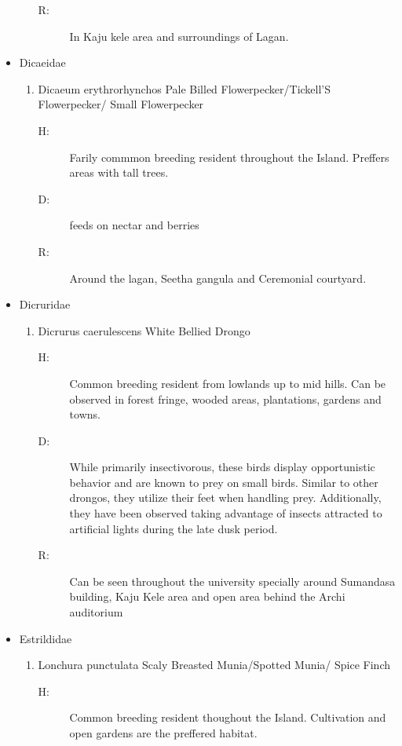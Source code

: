 \begin{itemize}
\begin{enumerate}
\begin{description}
\item[R: ]%
In Kaju kele area and surroundings of Lagan.%
\end{description}%
\end{enumerate}%
\item%
Dicaeidae%
\begin{enumerate}%
\item%
Dicaeum erythrorhynchos\newline%
Pale Billed Flowerpecker/Tickell'S Flowerpecker/ Small Flowerpecker%
\begin{description}%
\item[H: ]%
Farily commmon breeding resident throughout the Island. Preffers areas with tall trees.%
\item[D: ]%
 feeds on nectar and berries%
\item[R: ]%
Around the lagan, Seetha gangula and Ceremonial courtyard.%
\end{description}%
\end{enumerate}%
\item%
Dicruridae%
\begin{enumerate}%
\item%
Dicrurus caerulescens\newline%
White Bellied Drongo%
\begin{description}%
\item[H: ]%
Common breeding resident from lowlands up to mid hills. Can be observed in forest fringe, wooded areas, plantations, gardens and towns.%
\item[D: ]%
While primarily insectivorous, these birds display opportunistic behavior and are known to prey on small birds. Similar to other drongos, they utilize their feet when handling prey. Additionally, they have been observed taking advantage of insects attracted to artificial lights during the late dusk period.%
\item[R: ]%
Can be seen throughout the university specially around Sumandasa building, Kaju Kele area and open area behind the Archi auditorium%
\end{description}%
\end{enumerate}%
\item%
Estrildidae%
\begin{enumerate}%
\item%
Lonchura punctulata\newline%
Scaly Breasted Munia/Spotted Munia/ Spice Finch%
\begin{description}%
\item[H: ]%
Common breeding resident thoughout the Island. Cultivation and open gardens are the preffered habitat.%

\end{description}
\end{enumerate}
\end{itemize}
